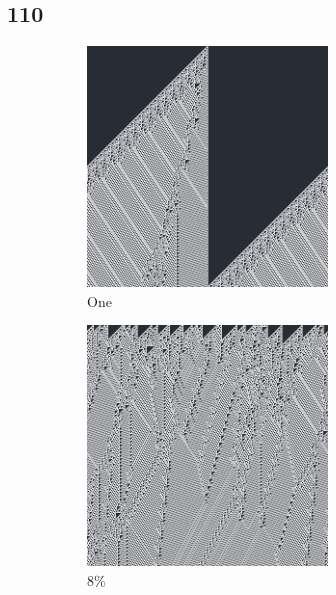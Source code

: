 \documentclass[12pt, fleqn]{report}                             %
\theoremstyle{break}                                            %
\begin{document}
        \subsection{110}
        \begin{figure}[h!]
          \centering
          \begin{subfigure}[b]{0.4\linewidth}
            \includegraphics[width=0.7\textwidth]{Images/110/a.png}
            \caption{One}
          \end{subfigure}
          \begin{subfigure}[b]{0.4\linewidth}
            \includegraphics[width=0.7\textwidth]{Images/110/b.png}
            \caption{8\%}
          \end{subfigure}
          \begin{subfigure}[b]{0.4\linewidth}

\end{subfigure}
\end{figure}
\end{document}
